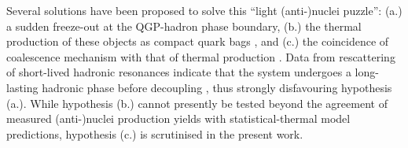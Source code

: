 \documentclass[a4paper,11pt]{scrartcl} %
\begin{document}
Several solutions have been proposed to solve this ``light (anti-)nuclei puzzle'': (a.) a sudden freeze-out at the QGP-hadron phase boundary, (b.) the thermal production of these objects as compact quark bags \cite{Andronic:2017}, and (c.) the coincidence of coalescence mechanism with that of thermal production \cite{Scheibl:1998tk}.
Data from rescattering of short-lived hadronic resonances indicate that the system undergoes a long-lasting hadronic phase before decoupling \cite{Abelev:2014uua}, thus strongly disfavouring hypothesis (a.). 
While hypothesis (b.) cannot presently be tested beyond the agreement of measured (anti-)nuclei production yields with statistical-thermal model predictions, hypothesis (c.) is scrutinised in the present work.

\begin{table}[htb]


\end{table}
\end{document}
